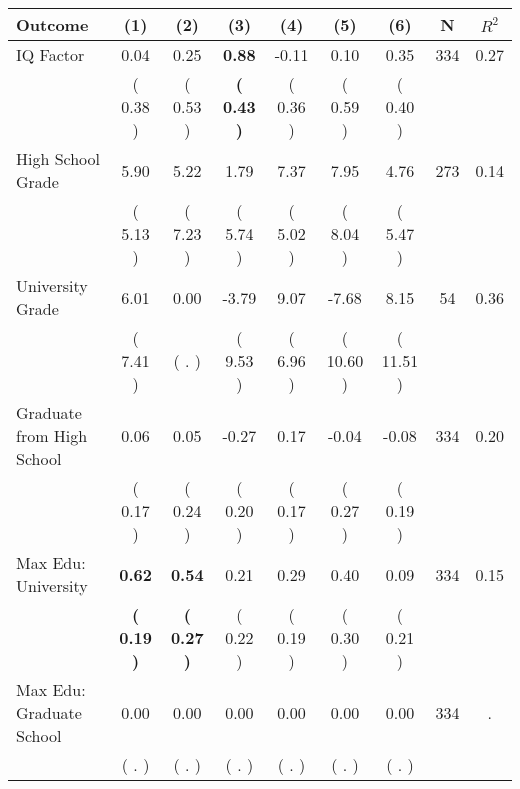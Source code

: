 \begin{tabular}{lcccccccc}
\toprule
 \textbf{Outcome} & \textbf{(1)} & \textbf{(2)} & \textbf{(3)} & \textbf{(4)} & \textbf{(5)} & \textbf{(6)} & \textbf{N} & \textbf{$ R^2$} \\
\midrule
IQ Factor &      0.04 &      0.25 & \textbf{     0.88} &     -0.11 &      0.10 &      0.35 & 334 &       0.27 \\ 
 & (     0.38 ) & (     0.53 ) & \textbf{(     0.43 )} & (     0.36 ) & (     0.59 ) & (     0.40 ) & \\
High School Grade &      5.90 &      5.22 &      1.79 &      7.37 &      7.95 &      4.76 & 273 &       0.14 \\ 
 & (     5.13 ) & (     7.23 ) & (     5.74 ) & (     5.02 ) & (     8.04 ) & (     5.47 ) & \\
University Grade &      6.01 &      0.00 &     -3.79 &      9.07 &     -7.68 &      8.15 & 54 &       0.36 \\ 
 & (     7.41 ) & (        . ) & (     9.53 ) & (     6.96 ) & (    10.60 ) & (    11.51 ) & \\
Graduate from High School &      0.06 &      0.05 &     -0.27 &      0.17 &     -0.04 &     -0.08 & 334 &       0.20 \\ 
 & (     0.17 ) & (     0.24 ) & (     0.20 ) & (     0.17 ) & (     0.27 ) & (     0.19 ) & \\
Max Edu: University & \textbf{     0.62} & \textbf{     0.54} &      0.21 &      0.29 &      0.40 &      0.09 & 334 &       0.15 \\ 
 & \textbf{(     0.19 )} & \textbf{(     0.27 )} & (     0.22 ) & (     0.19 ) & (     0.30 ) & (     0.21 ) & \\
Max Edu: Graduate School &      0.00 &      0.00 &      0.00 &      0.00 &      0.00 &      0.00 & 334 &          . \\ 
 & (        . ) & (        . ) & (        . ) & (        . ) & (        . ) & (        . ) & \\
\bottomrule
\end{tabular}
